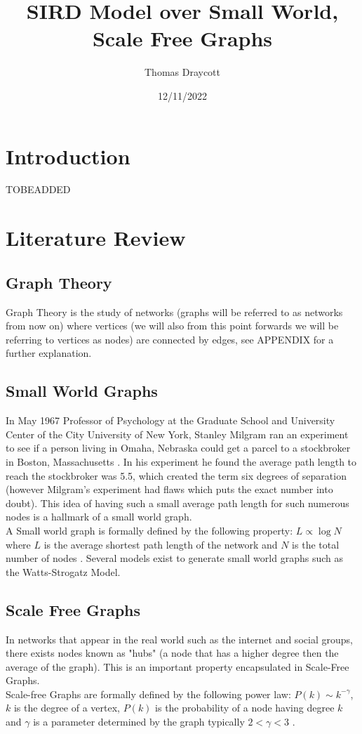 \documentclass{article}
\title{SIRD Model over Small World, Scale Free Graphs}
\date{12/11/2022}
\author{Thomas Draycott}
\begin{document}
    \maketitle
    \newpage
    \section{Introduction}
    TOBEADDED
    


    \section{Literature Review}
        \subsection{Graph Theory}
        Graph Theory is the study of networks (graphs will be referred to as networks from now on) where vertices (we will also from this point forwards we will be referring to vertices as nodes) are connected by edges, see APPENDIX for a further explanation.
        \subsection{Small World Graphs}
        In May 1967 Professor of Psychology at the Graduate School and University Center of the City University of New York, Stanley Milgram ran an experiment to see if a person living
        in Omaha, Nebraska could get a parcel to a stockbroker in Boston, Massachusetts \parencite{milgram1967small}. In his experiment he found the average path length to reach the stockbroker was 5.5, which created the term
        six degrees of separation (however Milgram's experiment had flaws which puts the exact number into doubt). This idea of having such a small average path length for such numerous nodes is a hallmark of a small world graph.\\
        A Small world graph is formally defined by the following property: $L\propto\log{N}$ where $L$ is the average shortest path length of the network and $N$ is the total number of nodes \parencite{Watts1998}. Several models exist to generate small world graphs such as the Watts-Strogatz Model.

        \subsection{Scale Free Graphs}
        In networks that appear in the real world such as the internet and social groups, there exists nodes known as "hubs" (a node that has a higher degree then the average of the graph). This is an important property encapsulated in Scale-Free Graphs.\\ 
        Scale-free Graphs are formally defined by the following power law: $P(k) \sim  k^{-\gamma }$, $k$ is the degree of a vertex, $P(k)$ is the probability of a node having degree $k$ and $\gamma$ is a parameter determined by the graph typically $2<\gamma<3$ \parencite{onnela2007structure}.
\end{document}
